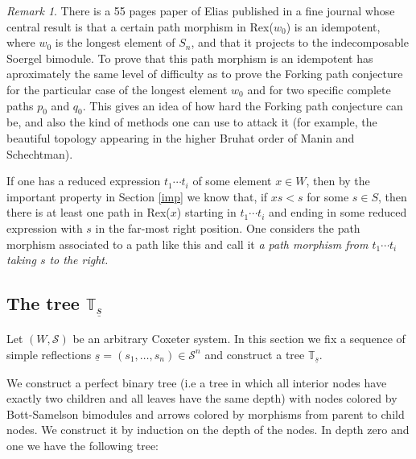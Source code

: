 \documentclass[12pt]{wart}
\theoremstyle{remark}
\newtheorem{remark}{Remark}
\begin{document}
\begin{remark}
There is a 55 pages paper of Elias \cite{El} published in a fine journal whose central result is  that a certain path morphism in Rex($w_0$) is an idempotent, where $w_0$ is the longest element of $S_n$, and that it projects to the indecomposable Soergel bimodule.  To prove that this path morphism is an idempotent has aproximately the same level of difficulty as to prove the Forking path conjecture for the particular case of the longest element $w_0$ and for  two specific complete paths $p_0$ and $q_0$. 
This gives an idea of how hard the Forking path conjecture can be, and also the kind of methods one can use to attack it (for example, the beautiful topology appearing in the higher Bruhat order of Manin and Schechtman).
\end{remark}









If one has a reduced expression $t_1\cdots t_i$ of some element $x\in W$, then by the important property in Section \ref{imp} we know that, if $xs<s$ for some $s\in S$, then  there is at least one path in Rex($x$) starting in $t_1\cdots t_i$ and ending in some reduced expression with $s$ in the far-most right position. One  considers the path morphism associated to a path like this and  call it \emph{a path morphism from $t_1\cdots t_i$ taking $s$ to the right. }




\subsection{The tree $\mathbb{T}_{\underline{s}}$}\label{T}

Let  $(W,\mathcal{S})$ be  an arbitrary Coxeter system. In this section we fix a sequence of simple reflections 
 $\underline{s}=(s_1,\ldots, s_n) \in \mathcal{S}^n$ and construct a tree $\mathbb{T}_{\underline{s}}$.




We construct a perfect binary tree (i.e a tree in which all interior nodes have exactly two children and all leaves have the same depth) with nodes colored by Bott-Samelson bimodules and arrows colored by morphisms from parent to  child nodes. We construct it by induction on the depth of the nodes. In depth zero and  one we have the following tree:

\vspace{0.5cm}
\end{document}
